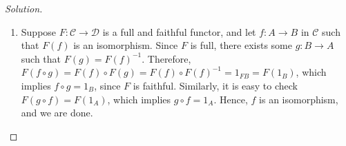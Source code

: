 \documentclass[]{amsbook}
\newcommand{\0}{\mathbf{0}}
\newcommand{\1}{\mathbf{1}}
\newcommand{\mc}[1]{\mathcal{#1}}
\newenvironment{solution}
    {\begin{proof}[Solution]}{\end{proof}}
\begin{document}
\begin{solution}
\begin{enumerate}
    \item Suppose $F: \mc{C} \to \mc{D}$ is a full and faithful functor, and
    let $f: A \to B$ in $\mc{C}$ such that $F(f)$ is an isomorphism. Since $F$
    is full, there exists some $g: B \to A$ such that $F(g) = F(f)^{-1}$.
    Therefore, $F(f \circ g) = F(f) \circ F(g) = F(f) \circ F(f)^{-1} = 1_{FB}
    = F(1_B)$, which implies $f \circ g = 1_B$, since $F$ is faithful.
    Similarly, it is easy to check $F(g \circ f) = F(1_A)$, which implies
    $g \circ f = 1_A$. Hence, $f$ is an isomorphism, and we are done.
\end{enumerate}
\end{solution}
\end{document}
